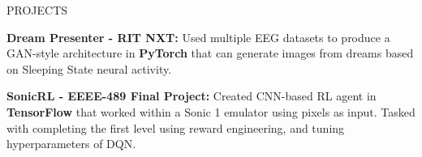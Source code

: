\documentclass{resume} %
\begin{document}

\begin{rSection}{PROJECTS}
\vspace{-0.75em}
\item \textbf{Dream Presenter - RIT NXT:} {Used multiple EEG datasets to produce a GAN-style architecture in \textbf{PyTorch} that can generate images from dreams based on Sleeping State neural activity.}
\item \textbf{SonicRL - EEEE-489 Final Project:} {Created CNN-based RL agent in \textbf{TensorFlow} that worked within a Sonic 1 emulator using pixels as input.
Tasked with completing the first level using reward engineering, and tuning hyperparameters of DQN.}
\end{rSection} 
\end{document}
